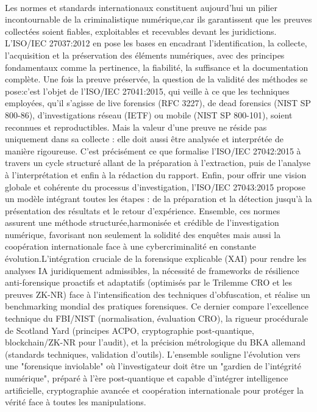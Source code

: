 \documentclass[12pt,a4paper]{article}
\begin{document}
{{\paragraph{}
Les normes et standards internationaux constituent aujourd’hui un pilier incontournable de la criminalistique numérique,car ils garantissent que les preuves collectées soient fiables, exploitables et recevables devant les juridictions. L’ISO/IEC 27037:2012 en pose les bases en encadrant l’identification, la collecte, l’acquisition et la préservation des éléments numériques, avec des principes fondamentaux comme la pertinence, la fiabilité, la suffisance et la documentation complète. Une fois la preuve préservée, la question de la validité des méthodes se pose:c’est l’objet de l’ISO/IEC 27041:2015, qui veille à ce que les techniques employées, qu’il s’agisse de live forensics (RFC 3227), de dead forensics (NIST SP 800-86), d’investigations réseau (IETF) ou mobile (NIST SP 800-101), soient reconnues et reproductibles. Mais la valeur d’une preuve ne réside pas uniquement dans sa collecte : elle doit aussi être analysée et interprétée de manière rigoureuse. C’est précisément ce que formalise l’ISO/IEC 27042:2015 à travers un cycle structuré allant de la préparation à l’extraction, puis de l’analyse à l’interprétation et enfin à la rédaction du rapport.
 Enfin, pour offrir une vision globale et cohérente du processus d’investigation, l’ISO/IEC 27043:2015 propose un modèle intégrant toutes les étapes : de la préparation et la détection jusqu’à la présentation des résultats et le retour d’expérience. Ensemble, ces normes assurent une méthode structurée,harmonisée et crédible de l’investigation numérique, favorisant non seulement la solidité des enquêtes mais aussi la coopération internationale face à une cybercriminalité en constante évolution.L'intégration cruciale de la forensique explicable (XAI) pour rendre les analyses IA juridiquement admissibles, la nécessité de frameworks de résilience anti-forensique proactifs et adaptatifs (optimisés par le Trilemme CRO et les preuves ZK-NR) face à l'intensification des techniques d'obfuscation, et réalise un benchmarking mondial des pratiques forensiques. Ce dernier compare l'excellence technique du FBI/NIST (normalisation, évaluation CRO), la rigueur procédurale de Scotland Yard (principes ACPO, cryptographie post-quantique, blockchain/ZK-NR pour l'audit), et la précision métrologique du BKA allemand (standards techniques, validation d'outils). L'ensemble souligne l'évolution vers une "forensique inviolable" où l'investigateur doit être un "gardien de l'intégrité numérique", préparé à l'ère post-quantique et capable d'intégrer intelligence artificielle, cryptographie avancée et coopération internationale pour protéger la vérité face à toutes les manipulations.

}}
\end{document}

